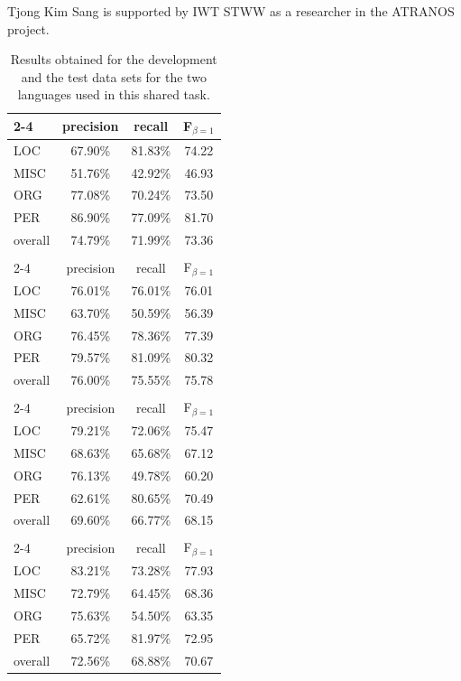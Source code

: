 \documentclass[11pt]{article}
\begin{document}
Tjong Kim Sang is supported by IWT STWW as a researcher in the ATRANOS
project.

\begin{table}[t]
\begin{center}
\begin{tabular}{|l|c|c|c|}\cline{2-4}
\multicolumn{1}{l|}{Spanish dev.}
                 & precision & recall & F$_{\beta=1}$ \\\hline
LOC     & 67.90\% & 81.83\% & 74.22 \\
MISC    & 51.76\% & 42.92\% & 46.93 \\
ORG     & 77.08\% & 70.24\% & 73.50 \\
PER     & 86.90\% & 77.09\% & 81.70 \\\hline
overall & 74.79\% & 71.99\% & 73.36 \\\hline
\multicolumn{4}{c}{}\\\cline{2-4}
\multicolumn{1}{l|}{Spanish test}
                 & precision & recall & F$_{\beta=1}$ \\\hline
LOC     & 76.01\% & 76.01\% & 76.01 \\
MISC    & 63.70\% & 50.59\% & 56.39 \\
ORG     & 76.45\% & 78.36\% & 77.39 \\
PER     & 79.57\% & 81.09\% & 80.32 \\\hline
overall & 76.00\% & 75.55\% & 75.78 \\\hline
\multicolumn{4}{c}{}\\\cline{2-4}
\multicolumn{1}{l|}{Dutch devel.}
                 & precision & recall & F$_{\beta=1}$ \\\hline
LOC     & 79.21\% & 72.06\% & 75.47 \\
MISC    & 68.63\% & 65.68\% & 67.12 \\
ORG     & 76.13\% & 49.78\% & 60.20 \\
PER     & 62.61\% & 80.65\% & 70.49 \\\hline
overall & 69.60\% & 66.77\% & 68.15 \\\hline
\multicolumn{4}{c}{}\\\cline{2-4}
\multicolumn{1}{l|}{Dutch test}
                 & precision & recall & F$_{\beta=1}$ \\\hline
LOC     & 83.21\% & 73.28\% & 77.93 \\
MISC    & 72.79\% & 64.45\% & 68.36 \\
ORG     & 75.63\% & 54.50\% & 63.35 \\
PER     & 65.72\% & 81.97\% & 72.95 \\\hline
overall & 72.56\% & 68.88\% & 70.67 \\\hline
\end{tabular}
\end{center}
\caption{
Results obtained for the development and the test data sets for the
two languages used in this shared task.
}
\label{tab-final}
\end{table}

\small



\end{document}
